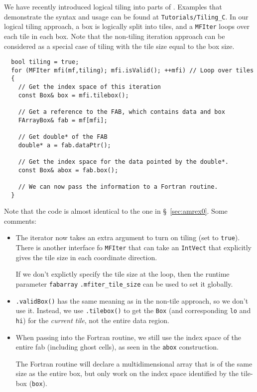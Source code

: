 We have recently introduced logical tiling into parts of \amrex.  
Examples that demonstrate the syntax and usage can be found at 
{\tt Tutorials/Tiling\_C}.
In our logical tiling approach, a box is logically split into tiles,
and a {\tt MFIter} loops over each tile in each box.  Note that the
non-tiling iteration approach can be considered as a special case of
tiling with the tile size equal to the box size.

\begin{lstlisting}
  bool tiling = true;
  for (MFIter mfi(mf,tiling); mfi.isValid(); ++mfi) // Loop over tiles
  {
    // Get the index space of this iteration
    const Box& box = mfi.tilebox(); 

    // Get a reference to the FAB, which contains data and box  
    FArrayBox& fab = mf[mfi];  

    // Get double* of the FAB 
    double* a = fab.dataPtr();

    // Get the index space for the data pointed by the double*.
    const Box& abox = fab.box();

    // We can now pass the information to a Fortran routine.
  }
\end{lstlisting}
Note that the code is almost identical to the one in \S~\ref{sec:amrex0}.
Some comments:
\begin{itemize}
\item The iterator now takes an extra argument to turn on tiling
(set to {\tt true}).  There is another interface fo {\tt MFIter}
that can take an {\tt IntVect} that explicitly gives the tile size
in each coordinate direction.

If we don't explictly specify the tile size at the loop, then the
runtime parameter {\tt fabarray} {\tt .mfiter\_tile\_size} can be used to set it
globally.

\item {\tt .validBox()} has the same meaning as in the non-tile approach,
so we don't use it.  Instead, we use {\tt .tilebox()} to get the
{\tt Box} (and corresponding {\tt lo} and {\tt hi}) for the {\em
current tile}, not the entire data region.

\item When passing into the Fortran routine, we still use the
index space of the entire fab (including ghost cells), as seen in
the {\tt abox} construction.

The Fortran routine will declare a multidimensional array that is of
the same size as the entire box, but only work on the index space
identified by the tile-box ({\tt box}).
\end{itemize}

